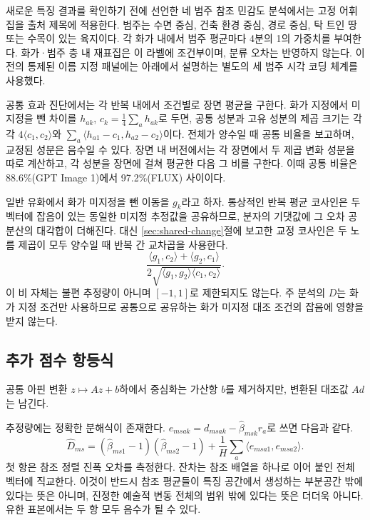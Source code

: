 \documentclass[11pt,a4paper]{article}
\begin{document}
새로운 특징 결과를 확인하기 전에 선언한 네 범주 참조 민감도 분석에서는 고정 어휘집을 출처 제목에 적용한다. 범주는 수면 중심, 건축 환경 중심, 경로 중심, 탁 트인 땅 또는 수목이 있는 육지이다. 각 화가 내에서 범주 평균마다 4분의 1의 가중치를 부여한다. 화가·범주 층 내 재표집은 이 라벨에 조건부이며, 분류 오차는 반영하지 않는다. 이전의 통제된 이름 지정 패널에는 아래에서 설명하는 별도의 세 범주 시각 코딩 체계를 사용했다.

공통 효과 진단에서는 각 반복 내에서 조건별로 장면 평균을 구한다. 화가 지정에서 미지정을 뺀 차이를 $h_{ak}$, $c_k=\frac14\sum_a h_{ak}$로 두면, 공통 성분과 고유 성분의 제곱 크기는 각각 $4\langle c_1,c_2\rangle$와 $\sum_a\langle h_{a1}-c_1,h_{a2}-c_2\rangle$이다. 전체가 양수일 때 공통 비율을 보고하며, 교정된 성분은 음수일 수 있다. 장면 내 버전에서는 각 장면에서 두 제곱 변화 성분을 따로 계산하고, 각 성분을 장면에 걸쳐 평균한 다음 그 비를 구한다. 이때 공통 비율은 88.6\%(GPT Image 1)에서 97.2\%(FLUX) 사이이다.

일반 유화에서 화가 미지정을 뺀 이동을 $g_k$라고 하자. 통상적인 반복 평균 코사인은 두 벡터에 잡음이 있는 동일한 미지정 추정값을 공유하므로, 분자의 기댓값에 그 오차 공분산의 대각합이 더해진다. 대신 \ref{sec:shared-change}절에 보고한 교정 코사인은 두 노름 제곱이 모두 양수일 때 반복 간 교차곱을 사용한다.
\[
 \frac{\langle g_1,c_2\rangle+\langle g_2,c_1\rangle}
 {2\sqrt{\langle g_1,g_2\rangle\langle c_1,c_2\rangle}}.
\]
이 비 자체는 불편 추정량이 아니며 $[-1,1]$로 제한되지도 않는다. 주 분석의 $D$는 화가 지정 조건만 사용하므로 공통으로 공유하는 화가 미지정 대조 조건의 잡음에 영향을 받지 않는다.

\subsection{추가 점수 항등식}\label{app:score-details}
공통 아핀 변환 $z\mapsto Az+b$하에서 중심화는 가산항 $b$를 제거하지만, 변환된 대조값 $Ad$는 남긴다.

추정량에는 정확한 분해식이 존재한다. $e_{msak}=d_{msak}-\widehat\beta_{msk}r_a$로 쓰면 다음과 같다.
\begin{equation}
 \widehat D_{ms}=
 (\widehat\beta_{ms1}-1)(\widehat\beta_{ms2}-1)
 +\frac1H\sum_a\langle e_{msa1},e_{msa2}\rangle.
 \label{eq:decomposition}
\end{equation}
첫 항은 참조 정렬 진폭 오차를 측정한다. 잔차는 참조 배열을 하나로 이어 붙인 전체 벡터에 직교한다. 이것이 반드시 참조 평균들이 특징 공간에서 생성하는 부분공간 밖에 있다는 뜻은 아니며, 진정한 예술적 변동 전체의 범위 밖에 있다는 뜻은 더더욱 아니다. 유한 표본에서는 두 항 모두 음수가 될 수 있다.
\end{document}
